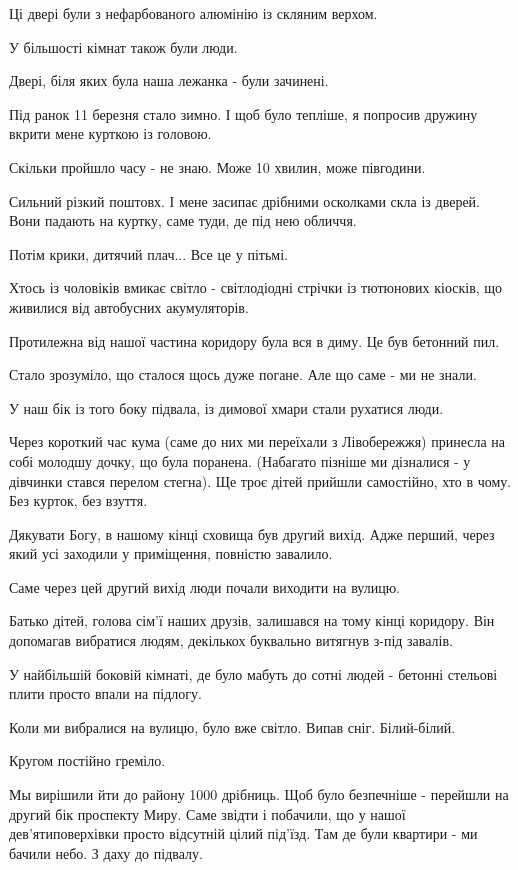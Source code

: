 Ці двері були з нефарбованого алюмінію із скляним верхом.

У більшості кімнат також були люди.

Двері, біля яких була наша лежанка - були зачинені.

Під ранок 11 березня стало зимно. І щоб було тепліше, я попросив дружину вкрити
мене курткою із головою.

Скільки пройшло часу - не знаю. Може 10 хвилин, може півгодини.

Сильний різкий поштовх. І мене засипає дрібними осколками скла із дверей. Вони
падають на куртку, саме туди, де під нею обличчя.

Потім крики, дитячий плач... Все це у пітьмі.

Хтось із чоловіків вмикає світло - світлодіодні стрічки із тютюнових кіосків,
що живилися від автобусних акумуляторів.

Протилежна від нашої частина коридору була вся в диму. Це був бетонний пил.

Стало зрозуміло, що сталося щось дуже погане. Але що саме - ми не знали.

У наш бік із того боку підвала, із димової хмари стали рухатися люди. 

Через короткий час кума (саме до них ми переїхали з Лівобережжя) принесла на
собі молодшу дочку, що була поранена. (Набагато пізніше ми дізналися - у
дівчинки стався перелом стегна). Ще троє дітей прийшли самостійно, хто в чому.
Без курток, без взуття. 

Дякувати Богу, в нашому кінці сховища був другий вихід. Адже перший, через який
усі заходили у приміщення, повністю завалило.

Саме через цей другий вихід люди почали виходити на вулицю. 

Батько дітей, голова сім'ї наших друзів, залишався на тому кінці коридору. Він
допомагав вибратися людям, декількох буквально витягнув з-під завалів. 

У найбільшій боковій кімнаті, де було мабуть до сотні людей - бетонні стельові
плити просто впали на підлогу. 

Коли ми вибралися на вулицю, було вже світло. Випав сніг. Білий-білий. 

Кругом постійно греміло. 

Мы вирішили йти до району 1000 дрібниць. Щоб було безпечніше - перейшли на
другий бік проспекту Миру. Саме звідти і побачили, що у нашої дев'ятиповерхівки
просто відсутній цілий під'їзд. Там де були квартири - ми бачили небо. З даху
до підвалу. 

